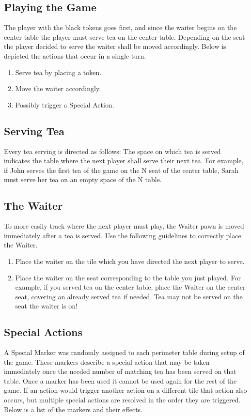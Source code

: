 \documentclass[a4paper]{article}
\begin{document}
\subsection{Playing​ ​the​ ​Game}
The player with the black tokens goes first, and since the waiter begins on the center table
the player must serve tea on the center table. Depending on the seat the player decided to serve
the waiter shall be moved accordingly. Below is depicted the actions that occur in a single turn.
\begin{enumerate}
\item Serve tea by placing a token.
\item Move the waiter accordingly.
\item Possibly trigger a Special Action.
\end{enumerate}

\subsection{Serving​ ​Tea}
Every tea serving is directed as follows: The space on which tea is served indicates the
table where the next player shall serve their next tea. For example, if John serves the first tea of
the game on the N seat of the center table, Sarah must serve her tea on an empty space of the N
table.

\subsection{The​ ​Waiter}
To more easily track where the next player must play, the Waiter pawn is moved
immediately after a tea is served. Use the following guidelines to correctly place the Waiter.

\begin{enumerate}
\item Place the waiter on the tile which you have directed the next player to serve.
\item Place the waiter on the seat corresponding to the table you just played. For example, if
you served tea on the center table, place the Waiter on the center seat, covering an
already served tea if needed. Tea may not be served on the seat the waiter is on!
\end{enumerate}

\subsection{Special​ ​Actions}
A Special Marker was randomly assigned to each perimeter table during setup of the
game. These markers describe a special action that may be taken immediately once the needed
number of matching tea has been served on that table. Once a marker has been used it cannot be
used again for the rest of the game. If an action would trigger another action on a different tile
that action also occurs, but multiple special actions are resolved in the order they are triggered.
Below is a list of the markers and their effects.
\end{document}
